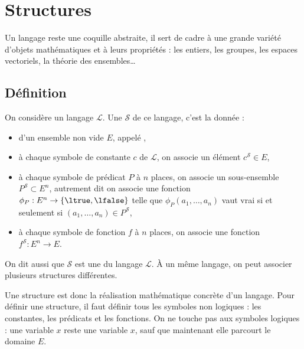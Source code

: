 \documentclass[11pt,class=report,crop=false]{standalone}
\begin{document}
\section{Structures}

Un langage reste une coquille abstraite, il sert de cadre à une grande variété d'objets mathématiques et à leurs propriétés : 
les entiers, les groupes, les espaces vectoriels, la théorie des ensembles\ldots

\subsection{Définition}

\begin{definition}
On considère un langage $\mathcal{L}$.
Une  $\mathcal{S}$ de ce langage, c'est la donnée :
\begin{itemize}
	\item d'un ensemble non vide $E$, appelé ,
	
	\item à chaque symbole de constante $c$ de $\mathcal{L}$, on associe un élément $c^{\mathcal{S}} \in E$,
	
	\item à chaque symbole de prédicat $P$ à $n$ places, on associe un sous-ensemble $P^{\mathcal{S}} \subset E^n$, 
	autrement dit on associe une fonction $\phi_P : E^n \to \{ \ltrue,\lfalse \}$ telle que $\phi_P(a_1,\ldots,a_n)$ vaut vrai si et seulement si 
	$(a_1,\ldots,a_n) \in P^{\mathcal{S}}$, 
	
	\item à chaque symbole de fonction $f$ à $n$ places, on associe une fonction $f^{\mathcal{S}} : E^n \to E$.
\end{itemize}
\end{definition}

On dit aussi que $\mathcal{S}$ est une  du langage $\mathcal{L}$.
À un même langage, on peut associer plusieurs structures différentes.

Une structure est donc la réalisation mathématique concrète d'un langage. 
Pour définir une structure, il faut définir tous les symboles non logiques : les constantes, les prédicats et les fonctions.
On ne touche pas aux symboles logiques : une variable $x$ reste une variable $x$, sauf que maintenant elle parcourt le domaine $E$.
\end{document}
